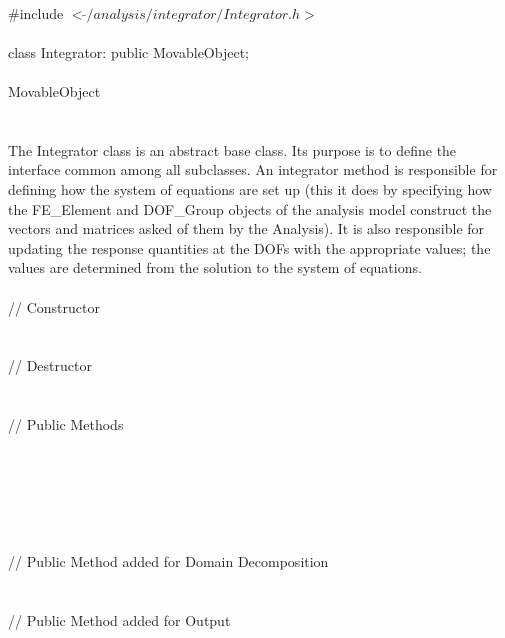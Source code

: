 
   \\
\indent \#include $<\tilde{ }/analysis/integrator/Integrator.h>$  \\

  \\
\indent class Integrator: public MovableObject;  \\

 \\
\indent MovableObject \\
\indent{} \\

 \\ 
\indent The Integrator class is an abstract base class. Its purpose is
to define the interface common among all subclasses. An integrator
method is responsible for defining how the system of equations are set
up (this it does by specifying how the FE\_Element and DOF\_Group
objects of the analysis model construct the vectors and matrices asked
of them by the Analysis). It is also responsible for updating the
response quantities at the DOFs with the appropriate values; the values
are determined from the solution to the system of equations. \\

 \\
\indent\indent // Constructor \\
\indent{}\\ \\
\indent\indent // Destructor \\
\indent{}\\  \\
\indent\indent // Public Methods \\
\indent{} \\
\indent{} \\
\indent{} \\
\indent{} \\
\indent{} \\ \\
\indent\indent // Public Method added for Domain Decomposition \\
\indent{} \\ \\
\indent\indent // Public Method added for Output \\
\indent{}\\

